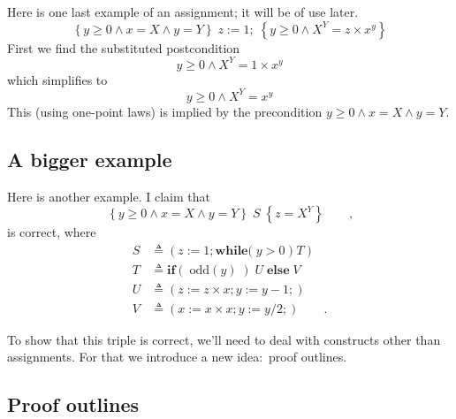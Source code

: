 \documentclass[muchmore,11pt]{article}%
\begin{document}
Here is one last example of an assignment; it will be of use later.%
\[
\left\{  y\geq0\wedge x=X\wedge y=Y\right\}  \;z:=1;\;\left\{  y\geq0\wedge
X^{Y}=z\times x^{y}\right\}
\]
First we find the substituted postcondition%
\[
y\geq0\wedge X^{Y}=1\times x^{y}%
\]
which simplifies to
\[
y\geq0\wedge X^{Y}=x^{y}%
\]
This (using one-point laws) is implied by the precondition $y\geq0\wedge
x=X\wedge y=Y$.

\subsection{A bigger example}

Here is another example. I claim that
\begin{equation}
\left\{  y\geq0\wedge x=X\wedge y=Y\right\}  \;S\;\left\{  z=X^{Y}\right\}
\qquad\text{,} \label{a}%
\end{equation}
is correct, where
\begin{align*}
S  &  \triangleq\left(  z:=1;\mathbf{while(}\;y>0\;)\;T\right) \\
T  &  \triangleq\mathbf{if}(\;\mathit{\mathrm{odd}}(y)\;)\;U\;\mathbf{else}%
\;V\\
U  &  \triangleq(z:=z\times x;y:=y-1;)\\
V  &  \triangleq(x:=x\times x;y:=y/2;)\qquad\text{.}%
\end{align*}


To show that this triple is correct, we'll need to deal with constructs other
than assignments. For that we introduce a new idea:\ proof outlines.

\subsection{Proof outlines}%
\end{document}
